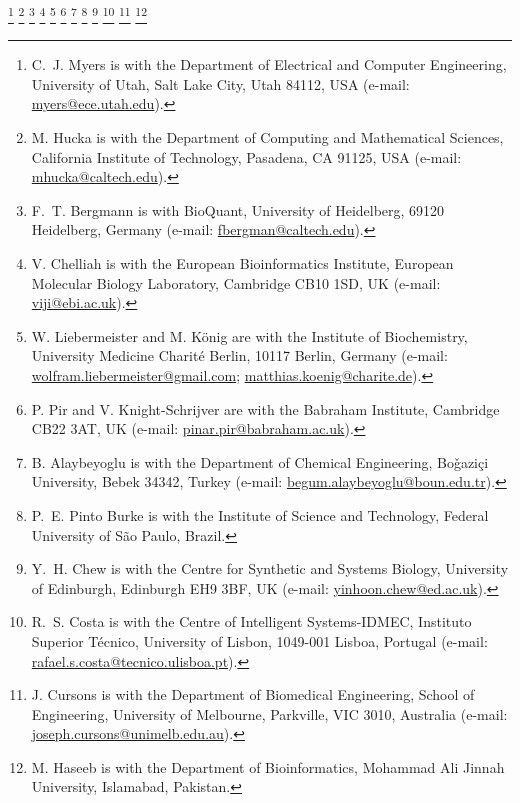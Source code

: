 \documentclass[journal,transmag]{IEEEtran}
\newcommand{\email}[1]{\href{mailto:#1}{#1}}
\begin{document}
{    \thanks{C.~J. Myers is with the Department of Electrical and Computer Engineering, University of Utah, Salt Lake City, Utah 84112, USA (e-mail: \email{myers@ece.utah.edu}).}
    \thanks{M. Hucka is with the Department of Computing and Mathematical Sciences, California Institute of Technology, Pasadena, CA 91125, USA (e-mail: \email{mhucka@caltech.edu}).}
    \thanks{F.~T. Bergmann is with BioQuant, University of Heidelberg, 69120 Heidelberg, Germany (e-mail: \email{fbergman@caltech.edu}).} 
    \thanks{V. Chelliah is with the European Bioinformatics Institute, European Molecular Biology Laboratory, Cambridge CB10 1SD, UK (e-mail: \email{viji@ebi.ac.uk}).}      
    \thanks{W. Liebermeister and M. K\"{o}nig are with the Institute of Biochemistry, University Medicine Charit\'{e} Berlin, 10117 Berlin, Germany (e-mail: \email{wolfram.liebermeister@gmail.com}; \email{matthias.koenig@charite.de}).}
    \thanks{P. Pir and V. Knight-Schrijver are with the Babraham Institute, Cambridge CB22 3AT, UK (e-mail: \email{pinar.pir@babraham.ac.uk}).}
    \thanks{B. Alaybeyoglu is with the Department of Chemical Engineering, Bo\v{g}azi\c{c}i University, Bebek 34342, Turkey (e-mail: \email{begum.alaybeyoglu@boun.edu.tr}).}
    \thanks{P.~E. Pinto Burke is with the Institute of Science and Technology, Federal University of São Paulo, Brazil.}
    \thanks{Y.~H. Chew is with the Centre for Synthetic and Systems Biology, University of Edinburgh, Edinburgh EH9 3BF, UK (e-mail: \email{yinhoon.chew@ed.ac.uk}).}
    \thanks{R.~S. Costa is with the Centre of Intelligent Systems-IDMEC, Instituto Superior Técnico, University of Lisbon, 1049-001 Lisboa, Portugal (e-mail: \email{rafael.s.costa@tecnico.ulisboa.pt}).}
    \thanks{J. Cursons is with the Department of Biomedical Engineering, School of Engineering, University of Melbourne, Parkville, VIC 3010, Australia (e-mail: \email{joseph.cursons@unimelb.edu.au}).}
    \thanks{M. Haseeb is with the Department of Bioinformatics, Mohammad Ali Jinnah University, Islamabad, Pakistan.}
}
\end{document}
